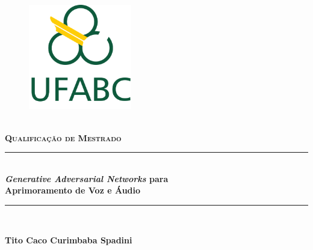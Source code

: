 \begin{titlepage}
		\newcommand{\HRule}{\rule{\linewidth}{0.5mm}}

		\center

		\begin{figure}
			\centering
			\includegraphics[width=0.4\textwidth]{figs/logo_ufabc.png}
		\end{figure}

		\\[0.5cm]
		\textsc{\textbf{\Large Qualificação de Mestrado}}\\[0.5cm] %


		\vspace{1.0cm}

		\HRule \\[0.4cm]
		{ \huge \bfseries \textit{Generative Adversarial Networks} para \\[0.5cm] Aprimoramento de Voz e Áudio}\\[0.25cm] %
		\HRule \\[1.0cm]

		\vspace{0.5cm}


		\vspace{1.0cm}

		\textbf{\LARGE Tito Caco Curimbaba Spadini}\\[1.0cm]


\end{titlepage}

